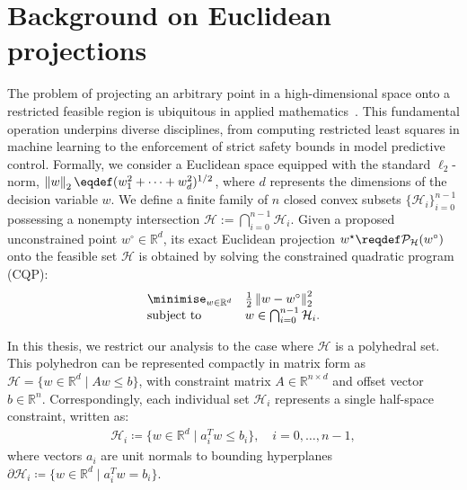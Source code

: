 \section{Background on Euclidean projections} \label{sec:euclidean_projections}

The problem of projecting an arbitrary point in a high-dimensional space onto a restricted feasible region is ubiquitous in applied mathematics~\cite{BOYDCONVEX}. This fundamental operation underpins diverse disciplines, from computing restricted least squares in machine learning to the enforcement of strict safety bounds in model predictive control. Formally, we consider a Euclidean space equipped with the standard $\ell_2$-norm, $\twonorm{w}\eqdef (w_1^2+\dots+w_d^2)^{1/2}$, where $d$ represents the dimensions of the decision variable $w$. We define a finite family of $n$ closed convex subsets $\{\mathcal{H}_i\}_{i=0}^{n-1}$ possessing a nonempty intersection $\mathcal{H} := \bigcap_{i=0}^{n-1} \mathcal{H}_i$. Given a proposed unconstrained point $w^\circ \in \mathbb{R}^d$, its exact Euclidean projection $w^\star \reqdef \mathcal{P}_{\mathcal{H}}(w^\circ)$ onto the feasible set $\mathcal{H}$ is obtained by solving the constrained quadratic program (CQP):
\begin{equation} \label{eq:projection}
\begin{array}{ll}
    {\displaystyle \minimise_{w \in \mathbb{R}^d}}  & \frac{1}{2}\twonorm{w - w^\circ}^2 \\
    \text{subject to} & w \in \bigcap_{i=0}^{n-1}\mathcal{H}_i.
\end{array}
\end{equation}

In this thesis, we restrict our analysis to the case where $\mathcal{H}$ is a polyhedral set. This polyhedron can be represented compactly in matrix form as $\mathcal{H}=\{w \in \mathbb{R}^d \mid A w \leq b\}$, with constraint matrix $A \in \mathbb{R}^{n\times d}$ and offset vector $b \in \mathbb{R}^n$. Correspondingly, each individual set $\mathcal{H}_i$ represents a single half-space constraint, written as:
\begin{align}\label{eq:halfspaces_i}
\mathcal{H}_i\coloneqq\{w \in \mathbb{R}^d \mid a_i^T w \leq b_i\}, \quad i=0,\dots,n-1,
\end{align}
where vectors $a_i$ are unit normals to bounding hyperplanes $\partial\mathcal{H}_i\coloneqq\{w \in \mathbb{R}^d \mid a_i^T w = b_i\}$.

